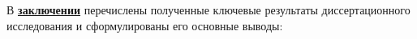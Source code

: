 
В \underline{\textbf{заключении}} перечислены полученные ключевые результаты диссертационного исследования и сформулированы его основные выводы:


\insertbibliofull   
{}













































